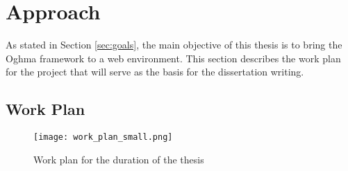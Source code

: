 \chapter{Approach}\label{chap:approach}

As stated in Section \ref{sec:goals}, the main objective of this thesis is to bring the Oghma framework to a web environment. This section describes the work plan for the project that will serve as the basis for the dissertation writing.

\section{Work Plan}\label{sec:work_plan}

\begin{figure}[H]
  \texttt{[image: work\_plan\_small.png]}
  \caption{Work plan for the duration of the thesis}
  \label{fig:work_plan}
\end{figure}

